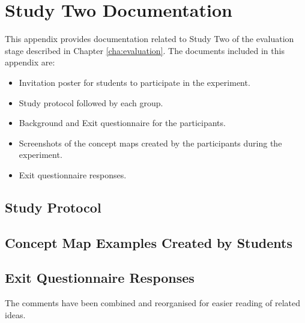 \chapter{Study Two Documentation \label{cha:app6}}

This appendix provides documentation related to Study Two of the evaluation
stage described in Chapter \ref{cha:evaluation}. The documents included in this
appendix are:

\begin{itemize}
  \item Invitation poster for students to participate in the experiment.
  \item Study protocol followed by each group.
  \item Background and Exit questionnaire for the participants.
  \item Screenshots of the concept maps created by the participants during the
  experiment.
  \item Exit questionnaire responses.
\end{itemize}



\section{Study Protocol}




\section{Concept Map Examples Created by Students}
\label{sec:examples1}

\section{Exit Questionnaire Responses}
\label{sec:responses}
The comments have been combined and reorganised for easier reading of related
ideas.

